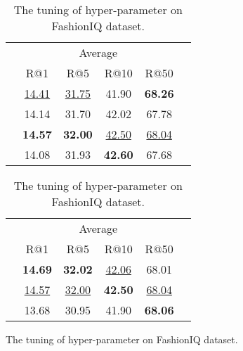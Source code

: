 \documentclass[letterpaper]{article} \usepackage{aaai24}  \usepackage{times}  \usepackage{helvet}  \usepackage{courier}  \usepackage[hyphens]{url}  \usepackage{graphicx} \urlstyle{rm} \def\UrlFont{\rm}  \usepackage{natbib}  \usepackage{caption} \frenchspacing  \setlength{\pdfpagewidth}{8.5in} \setlength{\pdfpageheight}{11in} \usepackage{amsmath,amsfonts}
\begin{document}
\begin{table}[]
    \centering
   \begin{tabular}{l|ccccc}
    \toprule
    \multirow{2}{*}{} & \multicolumn{4}{c}{Average}\\
    \cmidrule{2-5}
    \multirow{2}{*}{} & R@1 & R@5 & R@10 & R@50\\
    \toprule
     & \underline{14.41} & \underline{31.75} & 41.90 & \textbf{68.26} \\
     & 14.14 & 31.70 & 42.02 & 67.78 \\
     & \textbf{14.57} & \textbf{32.00} & \underline{42.50} & \underline{68.04} \\
     & 14.08 & 31.93 & \textbf{42.60} & 67.68 \\
    \bottomrule
    \end{tabular}
    \caption{The tuning of hyper-parameter  on FashionIQ dataset.}
    \label{tab:hyper-parameter theta}
\end{table}

\begin{table}[]
    \centering
     \begin{tabular}{l|ccccc}
    \toprule
    \multirow{2}{*}{} & \multicolumn{4}{c}{Average}\\
    \cmidrule{2-5}
    \multirow{2}{*}{} & R@1 & R@5 & R@10 & R@50 \\
    \toprule
     & \textbf{14.69} & \textbf{32.02} & \underline{42.06} & 68.01 \\
     & \underline{14.57} & \underline{32.00} & \textbf{42.50} & \underline{68.04} \\
     & 13.68 & 30.95 & 41.90 & \textbf{68.06} \\
    \bottomrule
    \end{tabular}
    \caption{The tuning of hyper-parameter  on FashionIQ dataset.}
    \label{tab:hyper-parameter n}
\end{table}

\iffalse
\begin{threeparttable}
    \centering
    \caption{The tuning of hyper-parameter  on FashionIQ dataset.}
    \label{tab:hyper-parameter theta}
\end{threeparttable}
\end{document}
